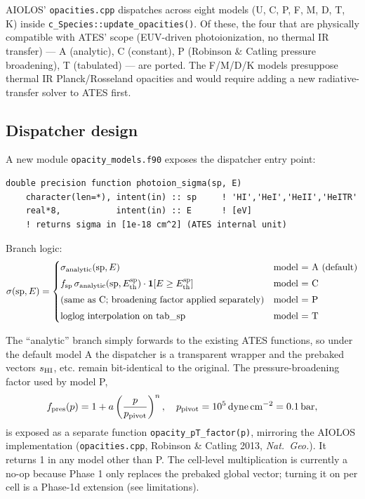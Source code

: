 \documentclass[english,a4paper]{my_memo}
\begin{document}
AIOLOS' \texttt{opacities.cpp} dispatches across eight models (U, C, P, F, M,
D, T, K) inside \texttt{c\_Species::update\_opacities()}. Of these, the four
that are physically compatible with ATES' scope (EUV-driven photoionization,
no thermal IR transfer) --- A (analytic), C (constant), P (Robinson \&
Catling pressure broadening), T (tabulated) --- are ported. The F/M/D/K
models presuppose thermal IR Planck/Rosseland opacities and would require
adding a new radiative-transfer solver to ATES first.

\subsection{Dispatcher design}

A new module \texttt{opacity\_models.f90} exposes the dispatcher entry point:
\begin{verbatim}
double precision function photoion_sigma(sp, E)
    character(len=*), intent(in) :: sp     ! 'HI','HeI','HeII','HeITR'
    real*8,           intent(in) :: E      ! [eV]
    ! returns sigma in [1e-18 cm^2] (ATES internal unit)
\end{verbatim}

Branch logic:
\[
\sigma(\mathrm{sp}, E) =
\begin{cases}
\sigma_{\rm analytic}(\mathrm{sp}, E) & \text{model = A (default)} \\[3pt]
f_{\rm sp}\,\sigma_{\rm analytic}(\mathrm{sp}, E_{\rm th}^{\rm sp}) \cdot \mathbf{1}[E \ge E_{\rm th}^{\rm sp}] & \text{model = C} \\[3pt]
\text{(same as C; broadening factor applied separately)} & \text{model = P} \\[3pt]
\text{loglog interpolation on tab\_sp} & \text{model = T}
\end{cases}
\]

The ``analytic'' branch simply forwards to the existing ATES functions, so
under the default model A the dispatcher is a transparent wrapper and the
prebaked vectors $s_{\rm HI}$, etc. remain bit-identical to the original.
The pressure-broadening factor used by model P,
\[
f_{\rm pres}(p) = 1 + a \left(\frac{p}{p_{\rm pivot}}\right)^n,
\quad p_{\rm pivot} = 10^5 \,\mathrm{dyne\,cm^{-2}} = 0.1\,\mathrm{bar},
\]
is exposed as a separate function \texttt{opacity\_pT\_factor(p)}, mirroring
the AIOLOS implementation (\texttt{opacities.cpp}, Robinson \& Catling 2013,
\textit{Nat.\ Geo.}). It returns 1 in any model other than P. The cell-level
multiplication is currently a no-op because Phase 1 only replaces the
prebaked global vector; turning it on per cell is a Phase-1d extension (see
limitations).
\end{document}
